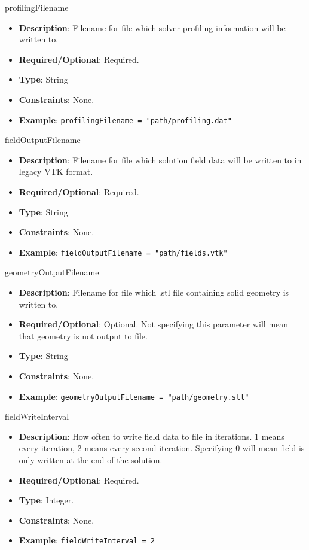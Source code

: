 profilingFilename
\vspace{\the\parameterListSpacing}
\begin{itemize}
    \item {\bf Description}: Filename for file which solver profiling information will be written to.
    \item {\bf Required/Optional}: Required.
    \item {\bf Type}: String
    \item {\bf Constraints}: None.
    \item {\bf Example}: \lstinline!profilingFilename = "path/profiling.dat"!
\end{itemize}

fieldOutputFilename
\vspace{\the\parameterListSpacing}
\begin{itemize}
    \item {\bf Description}: Filename for file which solution field data will be written to in legacy VTK format.
    \item {\bf Required/Optional}: Required.
    \item {\bf Type}: String
    \item {\bf Constraints}: None.
    \item {\bf Example}: \lstinline!fieldOutputFilename = "path/fields.vtk"!
\end{itemize}

geometryOutputFilename
\vspace{\the\parameterListSpacing}
\begin{itemize}
    \item {\bf Description}: Filename for file which .stl file containing solid geometry is written to.
    \item {\bf Required/Optional}: Optional. Not specifying this parameter will mean that geometry is not output to file.
    \item {\bf Type}: String
    \item {\bf Constraints}: None.
    \item {\bf Example}: \lstinline!geometryOutputFilename = "path/geometry.stl"!
\end{itemize}

fieldWriteInterval
\vspace{\the\parameterListSpacing}
\begin{itemize}
    \item {\bf Description}: How often to write field data to file in iterations. 1 means every iteration, 2 means every second iteration. Specifying 0 will mean field is only written at the end of the solution.
    \item {\bf Required/Optional}: Required.
    \item {\bf Type}: Integer.
    \item {\bf Constraints}: None.
    \item {\bf Example}: \lstinline!fieldWriteInterval = 2!
\end{itemize}


